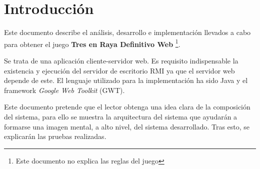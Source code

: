 \documentclass[a4paper,11pt,oneside]{article}
\begin{document}

\setcounter{page}{1}

\tableofcontents
\clearpage

\setcounter{page}{1}

\clearpage
\section{Introducción}

Este documento describe el análisis, desarrollo e implementación llevados a cabo para obtener
el juego \textbf{Tres en Raya Definitivo Web} \footnote{Este documento no explica las reglas del juego}.

Se trata de una aplicación cliente-servidor web. Es requisito indispensable la existencia y ejecución del servidor de escritorio RMI ya que el servidor web depende de este.
El lenguaje utilizado para la implementación ha sido Java y el framework \emph{Google Web Toolkit} (GWT).

Este documento pretende que el lector obtenga una idea clara de la composición del sistema, para ello se muestra la arquitectura del sistema que ayudarán a formarse una imagen mental, a alto nivel, del sistema desarrollado.
Tras esto, se explicarán las pruebas realizadas.

\clearpage



\clearpage


\clearpage
\end{document}
